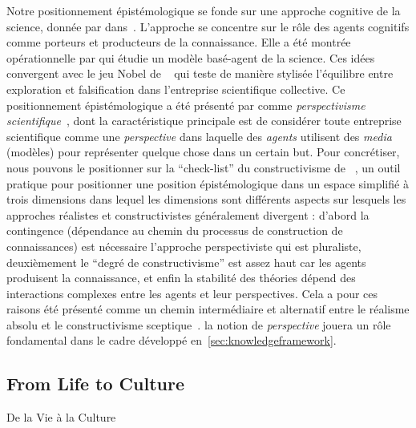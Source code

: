 {Notre positionnement épistémologique se fonde sur une approche cognitive de la science, donnée par  dans~\cite{giere2010explaining}. L'approche se concentre sur le rôle des agents cognitifs comme porteurs et producteurs de la connaissance. Elle a été montrée opérationnelle par \cite{giere2010agent} qui étudie un modèle basé-agent de la science. Ces idées convergent avec le jeu Nobel de ~\cite{chavalarias2016s} qui teste de manière stylisée l'équilibre entre exploration et falsification dans l'entreprise scientifique collective. Ce positionnement épistémologique a été présenté par  comme \emph{perspectivisme scientifique}~\cite{giere2010scientific}, dont la caractéristique principale est de considérer toute entreprise scientifique comme une \emph{perspective} dans laquelle des \emph{agents} utilisent des \emph{media} (modèles) pour représenter quelque chose dans un certain but. Pour concrétiser, nous pouvons le positionner sur la ``check-list'' du constructivisme de ~\cite{hacking1999social}, un outil pratique pour positionner une position épistémologique dans un espace simplifié à trois dimensions dans lequel les dimensions sont différents aspects sur lesquels les approches réalistes et constructivistes généralement divergent : d'abord la contingence (dépendance au chemin du processus de construction de connaissances) est nécessaire l'approche perspectiviste qui est pluraliste, deuxièmement le ``degré de constructivisme'' est assez haut car les agents produisent la connaissance, et enfin la stabilité des théories dépend des interactions complexes entre les agents et leur perspectives. Cela a pour ces raisons été présenté comme un chemin intermédiaire et alternatif entre le réalisme absolu et le constructivisme sceptique~\cite{brown2009models}. la notion de \emph{perspective} jouera un rôle fondamental dans le cadre développé en~\ref{sec:knowledgeframework}.
}







\subsection{From Life to Culture}{De la Vie à la Culture}

